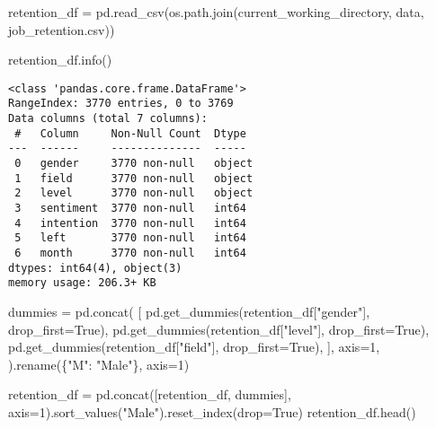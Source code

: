 \documentclass[
  letterpaper,
  DIV=11,
  numbers=noendperiod]{scrartcl}
\newenvironment{Shaded}{\begin{snugshade}}{\end{snugshade}}
\newcommand{\DecValTok}[1]{\textcolor[rgb]{0.68,0.00,0.00}{#1}}
\newcommand{\NormalTok}[1]{\textcolor[rgb]{0.00,0.23,0.31}{#1}}
\newcommand{\OperatorTok}[1]{\textcolor[rgb]{0.37,0.37,0.37}{#1}}
\newcommand{\StringTok}[1]{\textcolor[rgb]{0.13,0.47,0.30}{#1}}
\newcommand{\VariableTok}[1]{\textcolor[rgb]{0.07,0.07,0.07}{#1}}
\begin{document}
\begin{Shaded}
\begin{Highlighting}[]
\NormalTok{retention\_df }\OperatorTok{=}\NormalTok{ pd.read\_csv(os.path.join(current\_working\_directory, }\StringTok{\textquotesingle{}data\textquotesingle{}}\NormalTok{, }\StringTok{\textquotesingle{}job\_retention.csv\textquotesingle{}}\NormalTok{))}

\NormalTok{retention\_df.info()}
\end{Highlighting}
\end{Shaded}

\begin{verbatim}
<class 'pandas.core.frame.DataFrame'>
RangeIndex: 3770 entries, 0 to 3769
Data columns (total 7 columns):
 #   Column     Non-Null Count  Dtype 
---  ------     --------------  ----- 
 0   gender     3770 non-null   object
 1   field      3770 non-null   object
 2   level      3770 non-null   object
 3   sentiment  3770 non-null   int64 
 4   intention  3770 non-null   int64 
 5   left       3770 non-null   int64 
 6   month      3770 non-null   int64 
dtypes: int64(4), object(3)
memory usage: 206.3+ KB
\end{verbatim}

\begin{Shaded}
\begin{Highlighting}[]
\NormalTok{dummies }\OperatorTok{=}\NormalTok{ pd.concat(}
\NormalTok{    [}
\NormalTok{        pd.get\_dummies(retention\_df[}\StringTok{"gender"}\NormalTok{], drop\_first}\OperatorTok{=}\VariableTok{True}\NormalTok{),}
\NormalTok{        pd.get\_dummies(retention\_df[}\StringTok{"level"}\NormalTok{], drop\_first}\OperatorTok{=}\VariableTok{True}\NormalTok{),}
\NormalTok{        pd.get\_dummies(retention\_df[}\StringTok{"field"}\NormalTok{], drop\_first}\OperatorTok{=}\VariableTok{True}\NormalTok{),}
\NormalTok{    ],}
\NormalTok{    axis}\OperatorTok{=}\DecValTok{1}\NormalTok{,}
\NormalTok{).rename(\{}\StringTok{"M"}\NormalTok{: }\StringTok{"Male"}\NormalTok{\}, axis}\OperatorTok{=}\DecValTok{1}\NormalTok{)}

\NormalTok{retention\_df }\OperatorTok{=}\NormalTok{ pd.concat([retention\_df, dummies], axis}\OperatorTok{=}\DecValTok{1}\NormalTok{).sort\_values(}\StringTok{"Male"}\NormalTok{).reset\_index(drop}\OperatorTok{=}\VariableTok{True}\NormalTok{)}
\NormalTok{retention\_df.head()}
\end{Highlighting}
\end{Shaded}
\end{document}
